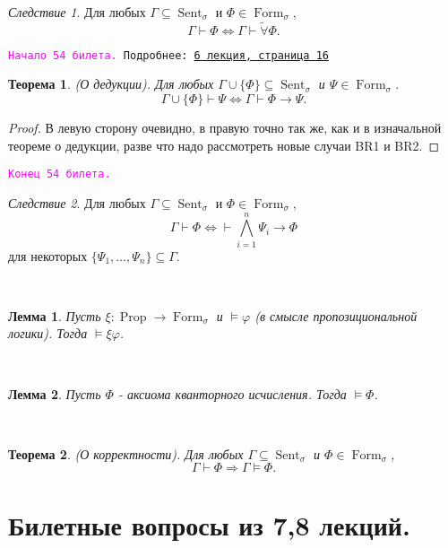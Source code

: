 \documentclass[a4paper,100pt]{article}
\theoremstyle{indented}
\newtheorem{theorem}{Теорема}
\newtheorem{lemma}{Лемма}
\theoremstyle{definition}
\theoremstyle{remark}
\newtheorem{cons}{Следствие}
\DeclareMathOperator{\ra}{\rightarrow}
\DeclareMathOperator{\Llra}{\Longleftrightarrow}
\DeclareMathOperator{\Prop}{Prop}
\DeclareMathOperator{\form}{Form}
\DeclareMathOperator{\Sent}{Sent}
\begin{document}
\begin{cons}
  Для любых $\Gamma \subseteq \Sent_\sigma$ и $\Phi \in \form_\sigma$, 
  \[
    \Gamma \vdash \Phi \Llra \Gamma \vdash \tilde{\forall} \Phi.
  \]
\end{cons}

\hrulefill

\texttt{\hypertarget{b54}{\textcolor{magenta}{Начало 54 билета.}} Подробнее: \href{http://www.mi-ras.ru/~speranski/courses/logic-1-2021-spring/slides_6.pdf}{6 лекция, страница 16}} 

\begin{theorem}
  (О дедукции). Для любых $\Gamma \cup \{\Phi\}\subseteq \Sent_\sigma$ и $\Psi \in \form_\sigma$. 
  \[
    \Gamma \cup \{ \Phi \} \vdash \Psi \Llra \Gamma \vdash \Phi \ra \Psi. 
  \]
\end{theorem}

\begin{proof}
  В левую сторону очевидно, в правую точно так же, как и в изначальной теореме о дедукции, разве что надо рассмотреть новые случаи BR1 и BR2. 
\end{proof}

\texttt{\textcolor{magenta}{Конец 54 билета.}} 

\hrulefill

\begin{cons}
  Для любых $\Gamma \subseteq \Sent_\sigma$ и $\Phi \in \form_\sigma$,  
  \[
    \Gamma \vdash \Phi \Longleftrightarrow \vdash \bigwedge_{i=1}^n \Psi_i\rightarrow \Phi
  \]
  для некоторых $\{\Psi_1, \ldots, \Psi_n\}\subseteq \Gamma$.
\end{cons} \

\begin{lemma}
  Пусть $\xi: \Prop \ra \form_\sigma$ и $\vDash \varphi$ (в смысле пропозициональной логики). Тогда $\vDash \xi \varphi$. 
\end{lemma} \

\begin{lemma}
  Пусть $\Phi$ - аксиома кванторного исчисления. Тогда $\vDash \Phi$. 
\end{lemma} \

\begin{theorem}
  (О корректности). Для любых $\Gamma \subseteq \Sent_\sigma$ и $\Phi \in \form_\sigma$, 
  \[
    \Gamma \vdash \Phi \Longrightarrow \Gamma \vDash \Phi. 
  \]
\end{theorem}

\section{Билетные вопросы из 7,8 лекций.}
\end{document}
